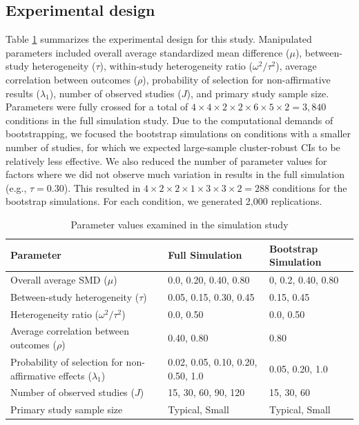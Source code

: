 \documentclass[
  man, donotrepeattitle,floatsintext]{apa7}
\begin{document}
\subsection{Experimental design}\label{experimental-design}

Table \ref{tab:sim-design} summarizes the experimental design for this study.
Manipulated parameters included overall average standardized mean difference
(\(\mu\)), between-study heterogeneity (\(\tau\)), within-study heterogeneity ratio
(\(\omega^2 / \tau^2\)), average correlation between outcomes (\(\rho\)),
probability of selection for non-affirmative results (\(\lambda_1\)), number of observed studies (\(J\)), and primary study sample size.
Parameters were fully crossed for a total of \(4 \times 4 \times 2 \times 2 \times 6 \times 5 \times 2 = 3,840\) conditions in the full simulation study.
Due to the computational demands of bootstrapping, we focused the bootstrap simulations on conditions with a smaller number of studies, for which we expected large-sample cluster-robust CIs to be relatively less effective.
We also reduced the number of parameter values for factors where we did
not observe much variation in results in the full simulation
(e.g., \(\tau = 0.30\)).
This resulted in \(4 \times 2 \times 2 \times 1 \times 3 \times 3 \times 2 = 288\) conditions for the bootstrap simulations.
For each condition, we generated 2,000 replications.

\begin{table}
\centering
\caption{\label{tab:sim-design}Parameter values examined in the simulation study}
\centering
\begin{tabular}[t]{>{\raggedright\arraybackslash}p{2.5in}ll}
\toprule
Parameter & Full Simulation & Bootstrap Simulation\\
\midrule
Overall average SMD ($\mu$) & 0.0, 0.20, 0.40, 0.80 & 0, 0.2, 0.40, 0.80\\
Between-study heterogeneity ($\tau$) & 0.05, 0.15, 0.30, 0.45 & 0.15, 0.45\\
Heterogeneity ratio ($\omega^2 / \tau^2$) & 0.0, 0.50 & 0.0, 0.50\\
Average correlation between outcomes ($\rho$) & 0.40, 0.80 & 0.80\\
Probability of selection for non-affirmative effects ($\lambda_1$) & 0.02, 0.05, 0.10, 0.20, 0.50, 1.0 & 0.05, 0.20, 1.0\\
\addlinespace
Number of observed studies ($J$) & 15, 30, 60, 90, 120 & 15, 30, 60\\
Primary study sample size & Typical, Small & Typical, Small\\
\bottomrule
\end{tabular}
\end{table}
\end{document}

